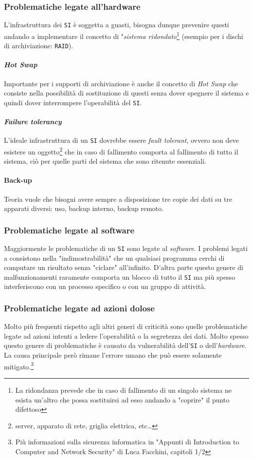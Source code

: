         \subsubsection{Problematiche legate all'hardware}
            L'infrastruttura dei \texttt{SI} è soggetta a guasti, bisogna dunque prevenire questi andando a implementare il concetto di "\textit{sistema ridondato}\footnote{La ridondanza prevede che in caso di fallimento di un singolo sistema ne esista un'altro che possa sostituirsi ad esso andando a "coprire" il punto difettoso} (esempio per i dischi di archiviazione: \texttt{RAID}).
            \paragraph{\textit{Hot Swap}} Importante per i supporti di archiviazione è anche il concetto di \textit{Hot Swap} che consiste nella possibilità di sostituzione di questi senza dover spegnere il sistema e quindi dover interrompere l'operabilità del \texttt{SI}. 
            \paragraph{\textit{Failure tolerancy}} L'ideale infrastruttura di un \texttt{SI} dovrebbe essere \textit{fault tolerant}, ovvero non deve esistere un oggetto\footnote{server, apparato di rete, griglia elettrica, etc\dots } che in caso di fallimento comporta al fallimento di tutto il sistema, ciò per quelle parti del sistema che sono ritenute essenziali.
            \paragraph{Back-up} Teoria vuole che bisogni avere sempre a disposizione tre copie dei dati su tre apparati diversi: uso, backup interno, backup remoto.
        \subsubsection{Problematiche legate al software}
            Maggiormente le problematiche di un \texttt{SI} sono legate al \textit{software}. I problemi legati a consistono nella "indimostrabilità" che un qualsiasi programma  cerchi di computare un risultato senza "ciclare" all'infinito. D'altra parte questo genere di malfunzionamenti raramente comporta un blocco di tutto il \texttt{SI} ma più spesso interferiscono con un processo specifico o con un gruppo di attività.
        \subsubsection{Problematiche legate ad azioni dolose}
            Molto più frequenti rispetto agli altri generi di criticità sono quelle problematiche legate ad azioni intenti a ledere l'operabilità o la segretezza dei dati. Molto spesso questo genere di problematiche è causato da vulnerabilità dell'\texttt{SI} o dell'\textit{hardware}. La causa principale però rimane l'errore umano che può essere solamente mitigato.\footnote{Più informazioni sulla sicurezza informatica in "Appunti di Introduction to Computer and Network Security" di Luca Facchini, capitoli 1/2}